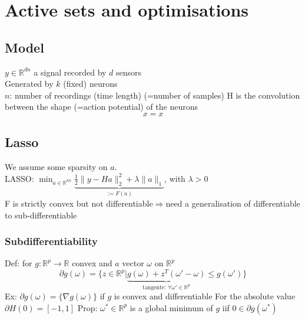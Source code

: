 \documentclass{report}
\begin{document}
	\chapter{Active sets and optimisations}
		\section{Model}
			$y\in\mathbb{R}^{dn}$ a signal recorded by $d$ sensors\\
			Generated by $k$ (fixed) neurons\\
			$n$: number of recordings (time length) (=number of samples)
			H is the convolution between the shape (=action potential) of the neurons
			\begin{equation*}
				x=x
			\end{equation*}
		\section{Lasso}
			We assume some sparsity on $a$.\\
			LASSO: $\min_{a\in\mathbb{R}^{kn}}\underbrace{\frac{1}{2}\|y-Ha\|_2^2+\lambda\|a\|_1}_{:=F(a)}$, with $\lambda>0$\\
			F is strictly convex but not differentiable$\Rightarrow$need a generalisation of differentiable to sub-differentiable\\
			\subsection{Subdifferentiability}
				Def: for $g:\mathbb{R}^p\rightarrow\mathbb{R}$ convex and $a$ vector $\omega$ on $\mathbb{R}^p$ \begin{equation*}
					\partial g(\omega)=\{z\in\mathbb{R}^p|\underbrace{g(\omega)+z^T(\omega'-\omega)}_{\text{tangente: }\forall\omega'\in\mathbb{R}^p}\leq g(\omega')\}
				\end{equation*}
				Ex: $\partial g(\omega)=\{\nabla g(\omega)\}$ if $g$ is convex and differentiable
				For the absolute value $\partial H(0)=[-1,1]$
				Prop: $\omega^*\in\mathbb{R}^p$ is a global minimum of $g$ iif $0\in\partial g(\omega^*)$
\end{document}
